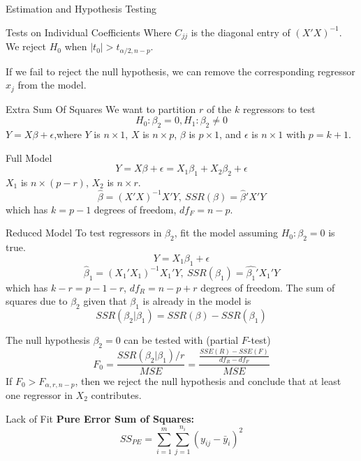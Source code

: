 \documentclass{article}
\begin{document}
\begin{multicols*}{3}
\begin{blackbox}{Estimation and Hypothesis Testing}
\begin{bluebox}{Tests on Individual Coefficients}
            Where $C_{jj}$ is the diagonal entry of $(X'X)^{-1}$. We reject $H_0$ when $|t_0| > t_{\alpha/2, n-p}$.
        \end{bluebox}
        If we fail to reject the null hypothesis, we can remove the corresponding regressor $x_j$ from the model.
    \end{blackbox}
    \begin{blackbox}{Extra Sum Of Squares}
        We want to partition $r$ of the $k$ regressors to test \\[-2.5ex]
        \[H_0: \beta_2 = 0, H_1: \beta_2 \neq 0\]
        $Y = X\beta + \epsilon$,where $Y$ is $n\times 1$, $X$ is $n\times p$, $\beta$ is $p\times 1$, and $\epsilon$ is $n \times 1$ with $p = k+1$.
        \begin{redbox}{Full Model}
            \[Y = X\beta + \epsilon = X_1\beta_1 + X_2\beta_2 + \epsilon\] 
            $X_1$ is $n \times (p-r)$, $X_2$ is $n\times r$.\\[-2ex]
           \[\hat{\beta} = (X'X)^{-1}X'Y, \ SSR(\beta) = \hat{\beta}'X'Y\]
           which has $k = p-1$ degrees of freedom, $df_F = n-p$.
        \end{redbox}
        \begin{brownbox}{Reduced Model}
            To test regressors in $\beta_2$, fit the model assuming $H_0: \beta_2 = 0$ is true. \\[-3ex]
            \[Y = X_1\beta_1 + \epsilon\]
            \[\hat{\beta}_1 = (X_1'X_1)^{-1}X_1'Y, \ SSR(\beta_1) = \hat{\beta_1}'X_1'Y\]
            which has $k-r = p - 1 - r$, $df_R = n-p+r$ degrees of freedom. The sum of squares due to $\beta_2$ given that $\beta_1$ is already in the model is \\[-3ex]
            \[SSR(\beta_2 | \beta_1) = SSR(\beta) - SSR(\beta_1)\]
        \end{brownbox}
        The null hypothesis $\beta_2=0$ can be tested with (partial $F$-test)\\[-4ex]
        \[F_0 = \frac{SSR(\beta_2|\beta_1)/r}{MSE} = \frac{\frac{SSE(R) - SSE(F)}{df_R-df_F}}{MSE}\]
        If $F_0 > F_{\alpha, r, n-p}$, then we reject the null hypothesis and conclude that at least one regressor in $X_2$ contributes.\\
    \end{blackbox}
    \begin{blackbox}{Lack of Fit}
        \textbf{Pure Error Sum of Squares:}\\[-2ex]
        \[SS_{PE} = \sum_{i=1}^m\sum_{j=1}^{n_i}(y_{ij} - \bar{y}_i)^2\]

\end{blackbox}
\end{multicols*}
\end{document}
